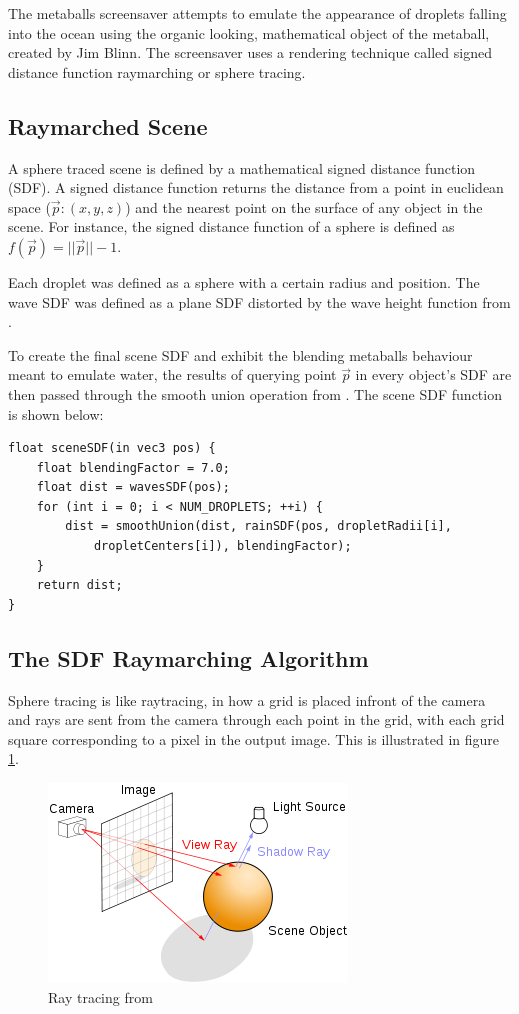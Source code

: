 \documentclass[10pt, openany]{book}
\begin{document}
The metaballs screensaver attempts to emulate the appearance of droplets falling into the ocean using the organic looking, mathematical object of the metaball, created by Jim Blinn. The screensaver uses a rendering technique called signed distance function raymarching or sphere tracing.

\subsection{Raymarched Scene}
A sphere traced scene is defined by a mathematical signed distance function (SDF). A signed distance function returns the distance from a point in euclidean space ($\vec{p}: (x,y,z)$) and the nearest point on the surface of any object in the scene. For instance, the signed distance function of a sphere is defined as $f(\vec{p}) = ||\vec{p}|| - 1$. 

Each droplet was defined as a sphere with a certain radius and position. The wave SDF was defined as a plane SDF distorted by the wave height function from \citep{fast-waves}.

To create the final scene SDF and exhibit the blending metaballs behaviour meant to emulate water, the results of querying point $\vec{p}$ in every object's SDF are then passed through the smooth union operation from \citep{quilez-dist}. The scene SDF function is shown below:

\begin{verbatim}
float sceneSDF(in vec3 pos) {
	float blendingFactor = 7.0;
	float dist = wavesSDF(pos);
	for (int i = 0; i < NUM_DROPLETS; ++i) {
		dist = smoothUnion(dist, rainSDF(pos, dropletRadii[i], 
			dropletCenters[i]), blendingFactor);
	}
	return dist;
}
\end{verbatim}

\subsection{The SDF Raymarching Algorithm}

Sphere tracing is like raytracing, in how a grid is placed infront of the camera and rays are sent from the camera through each point in the grid, with each grid square corresponding to a pixel in the output image. This is illustrated in figure \ref{fig:raytracing}.

\begin{figure}[H]
	\centering
	\includegraphics[width=0.35\linewidth]{Raytracing}
	\caption{Ray tracing from \citep{wikipedia:raytracing}}
	\label{fig:raytracing}
\end{figure}
\end{document}
